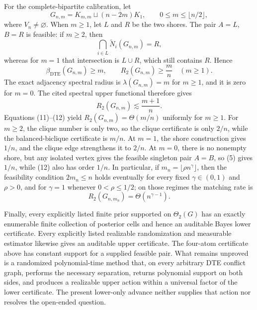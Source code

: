For the complete-bipartite calibration, let
\[
G_{n,m}=K_{m,m}\sqcup(n-2m)K_1,
\qquad
0\leq m\leq\lfloor n/2\rfloor,
\tag{9}
\]
where \(V_n\ne\varnothing\).  When \(m\geq1\), let \(L\) and \(R\) be the two shores.  The pair \(A=L\), \(B=R\) is feasible: if \(m\geq2\), then
\[
\bigcap_{i\in L}\widetilde N_i(G_{n,m})=R,
\tag{10}
\]
whereas for \(m=1\) that intersection is \(L\cup R\), which still contains \(R\).  Hence
\[
\beta_{\mathrm{DTE}}(G_{n,m})\geq m,
\qquad
R_2(G_{n,m})\geq\frac mn
\quad(m\geq1).
\tag{11}
\]
The exact adjacency spectral radius is \(\lambda(G_{n,m})=m\) for \(m\geq1\), and it is zero for \(m=0\).  The cited spectral upper functional therefore gives
\[
R_2(G_{n,m})\lesssim\frac{m+1}{n}.
\tag{12}
\]
Equations (11)--(12) yield \(R_2(G_{n,m})=\Theta(m/n)\) uniformly for \(m\geq1\).  For \(m\geq2\), the clique number is only two, so the clique certificate is only \(2/n\), while the balanced-biclique certificate is \(m/n\).  At \(m=1\), the shore construction gives \(1/n\), and the clique edge strengthens it to \(2/n\).  At \(m=0\), there is no nonempty shore, but any isolated vertex gives the feasible singleton pair \(A=B\), so (5) gives \(1/n\), while (12) also has order \(1/n\).  In particular, if \(m_n=\lfloor\rho n^{\gamma}\rfloor\), then the feasibility condition \(2m_n\leq n\) holds eventually for every fixed \(\gamma\in(0,1)\) and \(\rho>0\), and for \(\gamma=1\) whenever \(0<\rho\leq1/2\); on those regimes the matching rate is
\[
R_2(G_{n,m_n})=\Theta(n^{\gamma-1}).
\tag{13}
\]

Finally, every explicitly listed finite prior supported on \(\Theta_2(G)\) has an exactly enumerable finite collection of posterior cells and hence an auditable Bayes lower certificate.  Every explicitly listed realizable randomization and measurable estimator likewise gives an auditable upper certificate.  The four-atom certificate above has constant support for a supplied feasible pair.  What remains unproved is a randomized polynomial-time method that, on every arbitrary DTE conflict graph, performs the necessary separation, returns polynomial support on both sides, and produces a realizable upper action within a universal factor of the lower certificate.  The present lower-only advance neither supplies that action nor resolves the open-ended question.